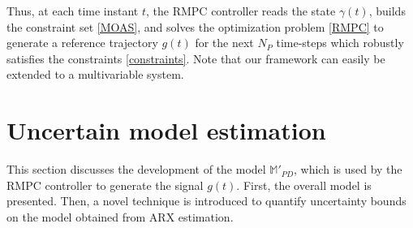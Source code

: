 \documentclass[letterpaper, 10 pt, conference]{ieeeconf}  %
\begin{document}
	 Thus, at each time instant $t$, the RMPC controller reads the state $\gamma(t)$, builds the constraint set \eqref{MOAS}, and solves the optimization problem \eqref{RMPC} to generate a reference trajectory $g(t)$ for the next $N_P$ time-steps which robustly satisfies the constraints \eqref{constraints}. Note that our framework can easily be extended to a multivariable system.
	 
	\section{Uncertain model estimation}
	\label{Contribution}
	This section discusses the development of the model $\mathbb{M}'_{PD}$, which is used by the RMPC controller to generate the signal $g(t)$. First, the overall model is presented. Then, a novel technique is introduced to quantify uncertainty bounds on the model obtained from ARX estimation.
\end{document}
